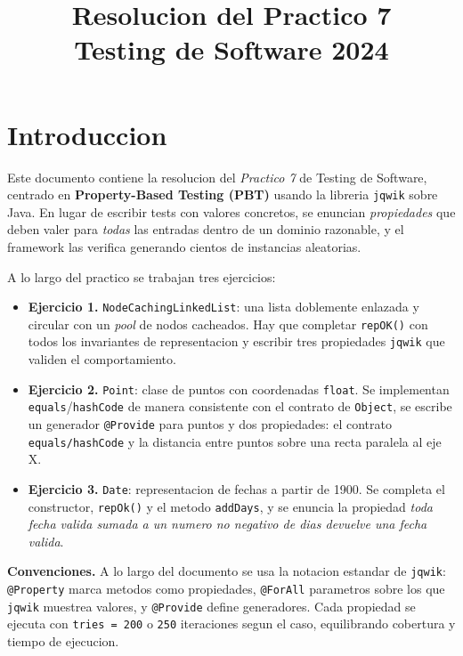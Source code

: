 \documentclass[12pt,a4paper]{article}
\title{\textbf{Resolucion del Practico 7}\\Testing de Software 2024}
\author{}
\date{}
\begin{document}
\maketitle
\tableofcontents
\newpage

\section*{Introduccion}

Este documento contiene la resolucion del \textit{Practico 7} de Testing de Software, centrado
en \textbf{Property-Based Testing (PBT)} usando la libreria \texttt{jqwik} sobre Java. En lugar
de escribir tests con valores concretos, se enuncian \emph{propiedades} que deben valer para
\emph{todas} las entradas dentro de un dominio razonable, y el framework las verifica generando
cientos de instancias aleatorias.

A lo largo del practico se trabajan tres ejercicios:

\begin{itemize}
  \item \textbf{Ejercicio 1.} \texttt{NodeCachingLinkedList}: una lista doblemente enlazada y
  circular con un \emph{pool} de nodos cacheados. Hay que completar \texttt{repOK()} con todos
  los invariantes de representacion y escribir tres propiedades \texttt{jqwik} que validen el
  comportamiento.
  \item \textbf{Ejercicio 2.} \texttt{Point}: clase de puntos con coordenadas \texttt{float}.
  Se implementan \texttt{equals}/\texttt{hashCode} de manera consistente con el contrato de
  \texttt{Object}, se escribe un generador \texttt{@Provide} para puntos y dos propiedades:
  el contrato \texttt{equals/hashCode} y la distancia entre puntos sobre una recta paralela al
  eje X.
  \item \textbf{Ejercicio 3.} \texttt{Date}: representacion de fechas a partir de 1900. Se
  completa el constructor, \texttt{repOk()} y el metodo \texttt{addDays}, y se enuncia la
  propiedad \emph{toda fecha valida sumada a un numero no negativo de dias devuelve una fecha
  valida}.
\end{itemize}

\textbf{Convenciones.} A lo largo del documento se usa la notacion estandar de \texttt{jqwik}:
\texttt{@Property} marca metodos como propiedades, \texttt{@ForAll} parametros sobre los que
\texttt{jqwik} muestrea valores, y \texttt{@Provide} define generadores. Cada propiedad se
ejecuta con \texttt{tries = 200} o \texttt{250} iteraciones segun el caso, equilibrando
cobertura y tiempo de ejecucion.
\end{document}
